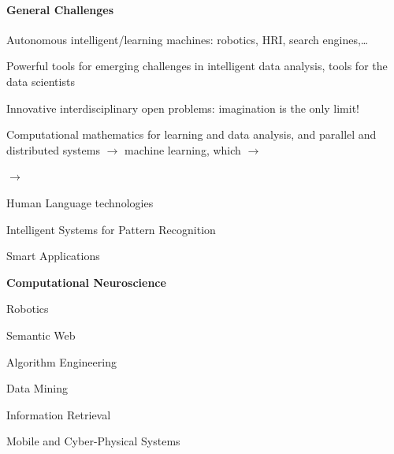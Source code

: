 \documentclass[10pt]{report}
\begin{document}
\paragraph{General Challenges}\begin{list}{}{}
	\item Autonomous intelligent/learning machines: robotics, HRI, search engines,\ldots
	\item Powerful tools for emerging challenges in intelligent data analysis, tools for the data scientists
	\item Innovative interdisciplinary open problems: imagination is the only limit!
\end{list}
Computational mathematics for learning and data analysis, and parallel and distributed systems $\longrightarrow$ machine learning, which $\longrightarrow$
\begin{list}{$\rightarrow$}{}
	\item Human Language technologies
	\item Intelligent Systems for Pattern Recognition
	\item Smart Applications
	\item \textbf{Computational Neuroscience}
	\item Robotics
	\item Semantic Web
	\item Algorithm Engineering
	\item Data Mining
	\item Information Retrieval
	\item Mobile and Cyber-Physical Systems
\end{list}
\end{document}
